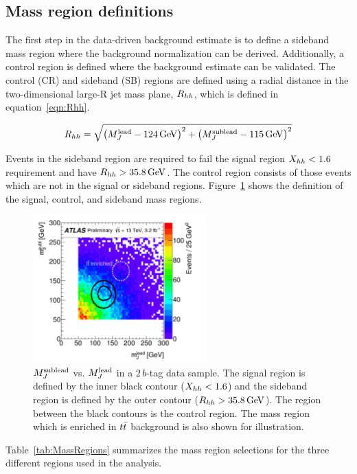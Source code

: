 \subsection{Mass region definitions}

The first step in the data-driven background estimate is to define a sideband mass region where the background normalization can be derived. Additionally, a control region is defined where the background estimate can be validated. The control (CR) and sideband (SB) regions are defined using a radial distance in the two-dimensional large-R jet mass plane, $R_{hh}$, which is defined in equation~\ref{eqn:Rhh}.

\begin{equation}
\label{eqn:Rhh}
\Rhh = \sqrt{\left(M_{J}^{\rm lead} - 124 \GeV\right)^2 + \left(M_{J}^{\rm sublead} - 115 \GeV\right)^2}
\end{equation}

Events in the sideband region are required to fail the signal region $X_{hh} < 1.6$ requirement and have $\Rhh > 35.8 \GeV$. The control region consists of those events which are not in the signal or sideband regions. Figure~\ref{fig:MassRegions} shows the definition of the signal, control, and sideband mass regions.
%
\begin{figure}[h!]
  \centering
  \captionsetup{justification=centering}

  \includegraphics[width=0.6\textwidth]{figures/MassRegions}
  \caption{$M_{J}^{\rm sublead}$ vs. $M_{J}^{\rm lead}$ in a $2\,b$-tag data sample. The signal region is defined by the inner black contour ($X_{hh} < 1.6$) and the sideband region is defined by the outer contour ($\Rhh > 35.8 \GeV$). The region between the black contours is the control region. The mass region which is enriched in $t\bar{t}$ background is also shown for illustration.~\cite{4bconf}}
  \label{fig:MassRegions}
\end{figure}
%
Table~\ref{tab:MassRegions} summarizes the mass region selections for the three different regions used in the analysis.

